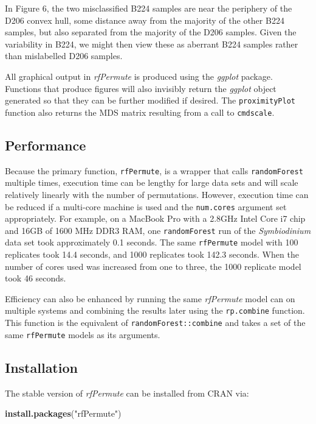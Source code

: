 \documentclass[]{article}
\newenvironment{Shaded}{\begin{snugshade}}{\end{snugshade}}
\newcommand{\KeywordTok}[1]{\textcolor[rgb]{0.13,0.29,0.53}{\textbf{{#1}}}}
\newcommand{\StringTok}[1]{\textcolor[rgb]{0.31,0.60,0.02}{{#1}}}
\newcommand{\NormalTok}[1]{{#1}}
\begin{document}
In Figure 6, the two misclassified B224 samples are near the periphery
of the D206 convex hull, some distance away from the majority of the
other B224 samples, but also separated from the majority of the D206
samples. Given the variability in B224, we might then view these as
aberrant B224 samples rather than mislabelled D206 samples.

All graphical output in \emph{rfPermute} is produced using the
\emph{ggplot} package. Functions that produce figures will also
invisibly return the \emph{ggplot} object generated so that they can be
further modified if desired. The \texttt{proximityPlot} function also
returns the MDS matrix resulting from a call to \texttt{cmdscale}.

\subsection{Performance}\label{performance}

Because the primary function, \texttt{rfPermute}, is a wrapper that
calls \texttt{randomForest} multiple times, execution time can be
lengthy for large data sets and will scale relatively linearly with the
number of permutations. However, execution time can be reduced if a
multi-core machine is used and the \texttt{num.cores} argument set
appropriately. For example, on a MacBook Pro with a 2.8GHz Intel Core i7
chip and 16GB of 1600 MHz DDR3 RAM, one \texttt{randomForest} run of the
\emph{Symbiodinium} data set took approximately 0.1 seconds. The same
\texttt{rfPermute} model with 100 replicates took 14.4 seconds, and 1000
replicates took 142.3 seconds. When the number of cores used was
increased from one to three, the 1000 replicate model took 46 seconds.

Efficiency can also be enhanced by running the same \emph{rfPermute}
model can on multiple systems and combining the results later using the
\texttt{rp.combine} function. This function is the equivalent of
\texttt{randomForest::combine} and takes a set of the same
\texttt{rfPermute} models as its arguments.

\subsection{Installation}\label{installation}

The stable version of \emph{rfPermute} can be installed from CRAN via:

\begin{Shaded}
\begin{Highlighting}[]
\KeywordTok{install.packages}\NormalTok{(}\StringTok{"rfPermute"}\NormalTok{)}
\end{Highlighting}
\end{Shaded}
\end{document}
